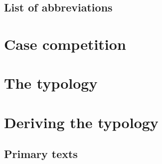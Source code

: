 \documentclass[hidelinks,a4paper,twoside,openright,14pt]{memoir}
\begin{document}

\clearpage

\phantom{x}
\vspace{-7em}
\tableofcontents
\clearpage

\phantom{x}
\vspace{-7em}
\listoftables
\clearpage

\phantom{x}
\vspace{-7em}
\listoffigures
\clearpage


\chapter*[List of abbreviations]{List of abbreviations}
\begingroup
  \setlength{\LTleft}{-\tabcolsep}
\printacronyms[include=abbr, heading=none]
\endgroup
{}
\clearpage

\mainmatter
\setcounter{secnumdepth}{4}



\part{Case competition}\label{part:case-facts}



\part{The typology}\label{part:variation}




\part{Deriving the typology}\label{part:deriving}








\backmatter

\clearpage
\chapter*{Primary texts}
\begingroup
  \setlength{\LTleft}{-\tabcolsep}
\printacronyms[include=texts, heading=none]
\endgroup
{}

\newrefcontext[sorting=nyt]
\printbibliography

\end{document}
